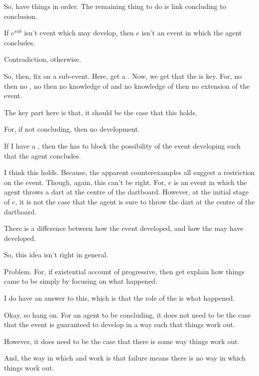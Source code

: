 \begin{note}
  So, have things in order.
  The remaining thing to do is link concluding to conclusion.

  \begin{idea}
    If \(e^{sub}\) isn't event which may develop, then \(e\) isn't an event in which the agent concludes.
    \begin{argument}
      Contradiction, otherwise.
    \end{argument}
  \end{idea}

  {
    \color{red}
    So, then, fix on a sub-event.
    Here, get a \requ{}.
    Now, we get that the \pevent{} is key.
    For, no \pevent{} then no \fc{}, no \fc{} then no knowledge of \fc{} and no knowledge of \fc{} then no extension of the event.
  }

  The key part here is that, it should be the case that this holds.

  For, if not concluding, then no development.

  If I have a \bCurb{}, then the \bCurb{} has to block the possibility of the event developing such that the agent concludes.

  I think this holds.
  Because, the apparent counterexamples all suggest a restriction on the event.
  Though, again, this can't be right.
  For, \(e\) is an event in which the agent throws a dart at the centre of the dartboard.
  However, at the initial stage of \(e\), it is not the case that the agent is sure to throw the dart at the centre of the dartboard.

  There is a difference between how the event developed, and how the may have developed.

  So, this idea isn't right in general.

  Problem.
  For, if existential account of progressive, then get explain how things came to be simply by focusing on what happened.

  I do have an answer to this, which is that the role of the \fc{} is what happened.

  Okay, so hang on.
  For an agent to be concluding, it does not need to be the case that the event is guaranteed to develop in a way such that things work out.

  However, it does need to be the case that there is some way things work out.

  And, the way in which  and  work is that failure means there is no way in which things work out.
\end{note}

